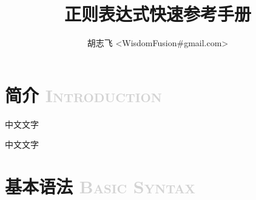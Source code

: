 \documentclass[12pt,a4paper,twoside]{ctexart}
\begin{document}
\title{正则表达式快速参考手册}
\author{胡志飞 <WisdomFusion\#gmail.com>}
\maketitle{}
\thispagestyle{empty}
\clearpage{}

\tableofcontents{}
\thispagestyle{empty}
\clearpage{}

\setcounter{page}{1}

\section[简介]{简介 \textcolor{lightgray}{\textsc{Introduction}}}
\label{sec:intro}

中文文字 \par
中文文字 \par
\lipsum[1] \par
\lipsum[2] \par

\section[基本语法]{基本语法 \textcolor{lightgray}{\textsc{Basic Syntax}}}
\label{sec:basic-syntax}
\end{document}

